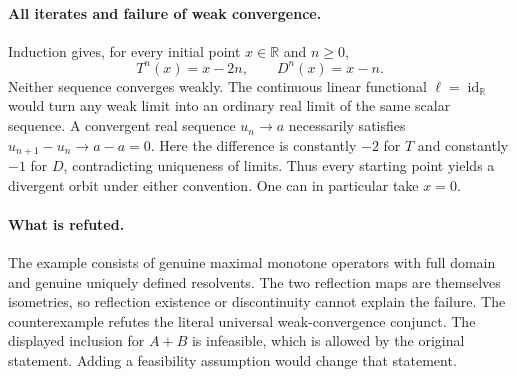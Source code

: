 \documentclass[11pt]{article}
\begin{document}
\paragraph{All iterates and failure of weak convergence.}
Induction gives, for every initial point $x\in\mathbb R$ and $n\geq0$,
\[
 T^n(x)=x-2n,\qquad D^n(x)=x-n.
\]
Neither sequence converges weakly. The continuous linear functional
$\ell=\operatorname{id}_{\mathbb R}$ would turn any weak limit into an ordinary real limit of the same scalar sequence. A convergent real sequence $u_n\to a$ necessarily satisfies
$u_{n+1}-u_n\to a-a=0$.
Here the difference is constantly $-2$ for $T$ and constantly $-1$ for $D$, contradicting uniqueness of limits. Thus every starting point yields a divergent orbit under either convention. One can in particular take $x=0$.

\paragraph{What is refuted.}
The example consists of genuine maximal monotone operators with full domain and genuine uniquely defined resolvents. The two reflection maps are themselves isometries, so reflection existence or discontinuity cannot explain the failure. The counterexample refutes the literal universal weak-convergence conjunct. The displayed inclusion for $A+B$ is infeasible, which is allowed by the original statement. Adding a feasibility assumption would change that statement.
\end{document}
